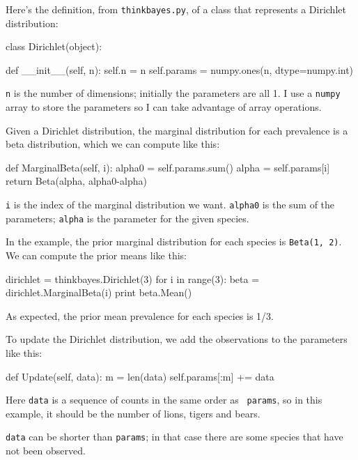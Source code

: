 \documentclass[12pt]{book}
\theoremstyle{exercise}
\newcommand{\py}[1]{{\tt #1}}%
\begin{document}
Here's the definition, from \py{thinkbayes.py}, of a class that
represents a Dirichlet distribution:

\begin{code}
class Dirichlet(object):

    def __init__(self, n):
        self.n = n
        self.params = numpy.ones(n, dtype=numpy.int)
\end{code}

\py{n} is the number of dimensions; initially the parameters
are all 1.  I use a \py{numpy} array to store the parameters
so I can take advantage of array operations.

Given a Dirichlet distribution, the marginal distribution
for each prevalence is a beta distribution, which we can
compute like this:

\begin{code}
    def MarginalBeta(self, i):
        alpha0 = self.params.sum()
        alpha = self.params[i]
        return Beta(alpha, alpha0-alpha)
\end{code}

\py{i} is the index of the marginal distribution we want.
\py{alpha0} is the sum of the parameters; \py{alpha} is the
parameter for the given species.

In the example, the prior marginal distribution for each species
is \py{Beta(1, 2)}.  We can compute the prior means like
this:

\begin{code}
    dirichlet = thinkbayes.Dirichlet(3)
    for i in range(3):
        beta = dirichlet.MarginalBeta(i)
        print beta.Mean()
\end{code}

As expected, the prior mean prevalence for each species is 1/3.

To update the Dirichlet distribution, we add the
observations to the parameters like this:

\begin{code}
    def Update(self, data):
        m = len(data)
        self.params[:m] += data
\end{code}

Here \py{data} is a sequence of counts in the same order as {\tt
  params}, so in this example, it should be the number of lions,
tigers and bears.

\py{data} can be shorter than \py{params}; in that
case there are some species that have not been
observed.
\end{document}
